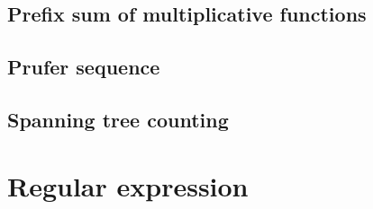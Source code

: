 \documentclass[UTF8,a4paper]{report}
\begin{document}
			\subsection{Prefix sum of multiplicative functions}
				
			\subsection{Prufer sequence}
				
			\subsection{Spanning tree counting}
				
		\section{Regular expression}
				
			
\end{document}
